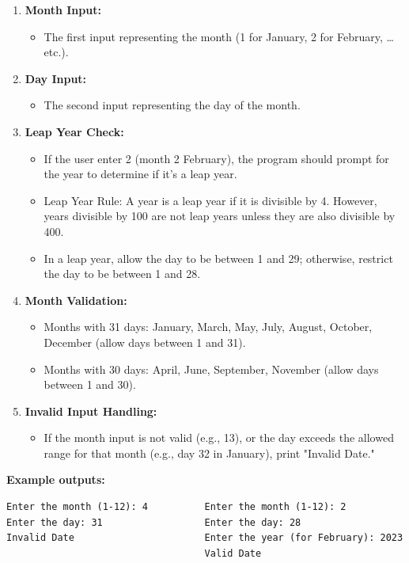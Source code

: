 \documentclass[a4paper,12pt]{article}
\begin{document}
\begin{enumerate}
\item \textbf{Month Input:}
\begin{itemize}
\item The first input representing the month (1 for January, 2 for February, \ldots etc.).
\end{itemize}
\item \textbf{Day Input:}
\begin{itemize}
    \item The second input representing the day of the month.
\end{itemize}

\item \textbf{Leap Year Check:}
\begin{itemize}
    \item If the user enter 2 (month 2 February), the program should prompt for the year to determine if it's a leap year.
    \item Leap Year Rule: A year is a leap year if it is divisible by 4. However, years divisible by 100 are not leap years unless they are also divisible by 400.
    \item In a leap year, allow the day to be between 1 and 29; otherwise, restrict the day to be between 1 and 28.
\end{itemize}

\item \textbf{Month Validation:}
\begin{itemize}
    \item Months with 31 days: January, March, May, July, August, October, December (allow days between 1 and 31).
    \item Months with 30 days: April, June, September, November (allow days between 1 and 30).
\end{itemize}

\item \textbf{Invalid Input Handling:}
\begin{itemize}
    \item If the month input is not valid (e.g., 13), or the day exceeds the allowed range for that month (e.g., day 32 in January), print "Invalid Date."
\end{itemize}
\end{enumerate}
\textbf{Example outputs:}

\begin{verbatim}
Enter the month (1-12): 4          Enter the month (1-12): 2
Enter the day: 31                  Enter the day: 28
Invalid Date                       Enter the year (for February): 2023
                                   Valid Date
\end{verbatim}
\end{document}

